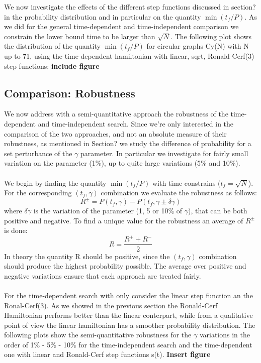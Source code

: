         We now investigate the effects of the different step functions discussed in section? in the probability distribution and in particular on the quantity $\min(t_f/P)$. As we did for the general time-dependent and time-independent comparison we constrain the lower bound time to be larger than $\sqrt{N}$.
        The following plot shows the distribution of the quantity $\min(t_f/P)$ for circular graphs Cy(N) with N up to 71, using the time-dependent hamiltonian with linear, sqrt, Ronald-Cerf(3) step functions:
        \textbf{include figure}

    \subsection{Comparison: Robustness}
    We now address with a semi-quantitative approach the robustness of the time-dependent and time-independent search. Since we're only interested in the comparison of the two approaches, and not an absolute measure of their robustness, as mentioned in Section? we study the difference of probability for a set perturbance of the $\gamma$ parameter. In particular we investigate for fairly small variation on the parameter (1\%), up to quite large variations (5\% and 10\%). \\ \\We begin by finding the quantity $\min(t_f/P)$ with time constrains ($t_f = \sqrt{N}$). For the corresponding $(t_f,\gamma)$ combination we evaluate the robustness as follows:
    \begin{equation}
        R ^\pm = P(t_f, \gamma) - P(t_f, \gamma \pm \delta\gamma)
    \end{equation}
    where $\delta\gamma$ is the variation of the parameter (1, 5 or 10\% of $\gamma$), that can be both positive and negative. To find a unique value for the robustness an average of $R^\pm$ is done:
    \begin{equation}
        R = \frac{R^++ R^-}{2}
    \end{equation}
    In theory the quantity R should be positive, since the $(t_f,\gamma)$ combination should produce the highest probability possible. The average over positive and negative variations ensure that each approach are treated fairly. \\ \\ For the time-dependent search with only consider the linear step function an the Ronal-Cerf(3). As we showed in the previous section the Ronald-Cerf Hamiltonian performs better than the linear conterpart, while from a qualitative point of view the linear hamiltonian has a smoother probability distribution. The following plots show the semi-quantitative robustness for the $\gamma$ variations in the order of 1\% - 5\% - 10\% for the time-independent search and the time-dependent one with linear and Ronald-Cerf step functions s(t).
    \textbf{Insert figure}



